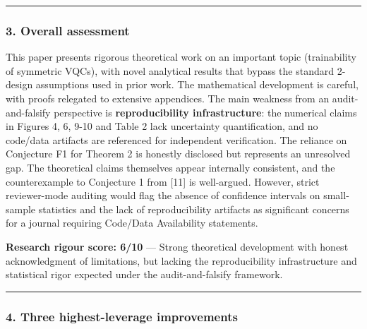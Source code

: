 \documentclass[10pt,letterpaper]{article}
\begin{document}
\begin{center}\rule{0.5\linewidth}{0.5pt}\end{center}

\hypertarget{overall-assessment}{%
\subsubsection{3. Overall assessment}\label{overall-assessment}}

This paper presents rigorous theoretical work on an important topic (trainability of symmetric VQCs), with novel analytical results that bypass the standard 2-design assumptions used in prior work. The mathematical development is careful, with proofs relegated to extensive appendices. The main weakness from an audit-and-falsify perspective is \textbf{reproducibility infrastructure}: the numerical claims in Figures 4, 6, 9-10 and Table 2 lack uncertainty quantification, and no code/data artifacts are referenced for independent verification. The reliance on Conjecture F1 for Theorem 2 is honestly disclosed but represents an unresolved gap. The theoretical claims themselves appear internally consistent, and the counterexample to Conjecture 1 from {[}11{]} is well-argued. However, strict reviewer-mode auditing would flag the absence of confidence intervals on small-sample statistics and the lack of reproducibility artifacts as significant concerns for a journal requiring Code/Data Availability statements.

\textbf{Research rigour score: 6/10} --- Strong theoretical development with honest acknowledgment of limitations, but lacking the reproducibility infrastructure and statistical rigor expected under the audit-and-falsify framework.

\begin{center}\rule{0.5\linewidth}{0.5pt}\end{center}

\hypertarget{three-highest-leverage-improvements}{%
\subsubsection{4. Three highest-leverage improvements}\label{three-highest-leverage-improvements}}
\end{document}
